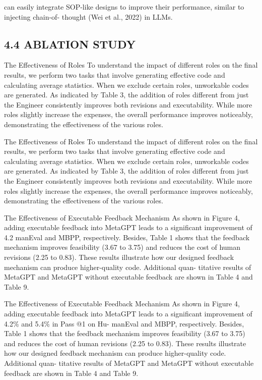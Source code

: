 \documentclass[12pt]{article}
\begin{document}
can easily integrate SOP-like designs to improve their performance, similar to injecting chain-of-
thought (Wei et al., 2022) in LLMs.


\subsection{4.4 ABLATION STUDY}


The Effectiveness of Roles To understand the impact of different roles on the final results, we
perform two tasks that involve generating effective code and calculating average statistics. When we
exclude certain roles, unworkable codes are generated. As indicated by Table 3, the addition of roles
different from just the Engineer consistently improves both revisions and executability. While more
roles slightly increase the expenses, the overall performance improves noticeably, demonstrating the
effectiveness of the various roles.


The Effectiveness of Roles To understand the impact of different roles on the final results, we
perform two tasks that involve generating effective code and calculating average statistics. When we
exclude certain roles, unworkable codes are generated. As indicated by Table 3, the addition of roles
different from just the Engineer consistently improves both revisions and executability. While more
roles slightly increase the expenses, the overall performance improves noticeably, demonstrating the
effectiveness of the various roles.


The Effectiveness of Executable Feedback Mechanism As shown in Figure 4, adding executable
feedback into MetaGPT leads to a significant improvement of 4.2%
manEval and MBPP, respectively. Besides, Table 1 shows that the feedback mechanism improves
feasibility (3.67 to 3.75) and reduces the cost of human revisions (2.25 to 0.83). These results
illustrate how our designed feedback mechanism can produce higher-quality code. Additional quan-
titative results of MetaGPT and MetaGPT without executable feedback are shown in Table 4 and
Table 9.


The Effectiveness of Executable Feedback Mechanism As shown in Figure 4, adding executable
feedback into MetaGPT leads to a significant improvement of 4.2\% and 5.4\% in Pass @1 on Hu-
manEval and MBPP, respectively. Besides, Table 1 shows that the feedback mechanism improves
feasibility (3.67 to 3.75) and reduces the cost of human revisions (2.25 to 0.83). These results
illustrate how our designed feedback mechanism can produce higher-quality code. Additional quan-
titative results of MetaGPT and MetaGPT without executable feedback are shown in Table 4 and
Table 9.
\end{document}
